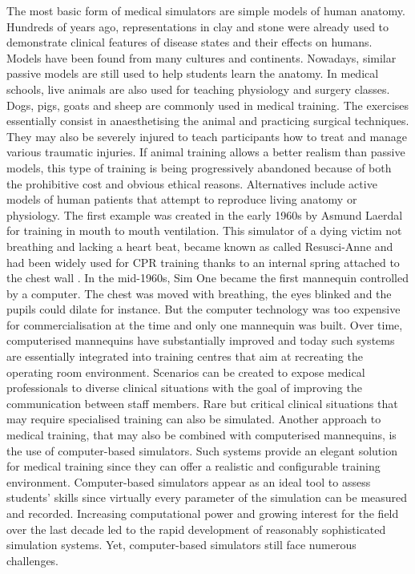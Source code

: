 \bigskip

The most basic form of medical simulators are simple models of human anatomy. Hundreds of years ago, representations in clay and stone were already used to demonstrate clinical features of disease states and their effects on humans. Models have been found from many cultures and continents. Nowadays, similar passive models are still used to help students learn the anatomy. In medical schools, live animals are also used for teaching physiology and surgery classes. Dogs, pigs, goats and sheep are commonly used in medical training. The exercises essentially consist in anaesthetising the animal and practicing surgical techniques. They may also be severely injured to teach participants how to treat and manage various traumatic injuries. If animal training allows a better realism than passive models, this type of training is being progressively abandoned because of both the prohibitive cost and obvious ethical reasons. Alternatives include active models of human patients that attempt to reproduce living anatomy or physiology. The first example was created in the early 1960s by Asmund Laerdal for training in mouth to mouth ventilation. This simulator of a dying victim not breathing and lacking a heart beat, became known as called Resusci-Anne and had been widely used for CPR training thanks to an internal spring attached to the chest wall \citep{Cooper04}. In the mid-1960s, Sim One became the first mannequin controlled by a computer. The chest was moved with breathing, the eyes blinked and the pupils could dilate for instance. But the computer technology was too expensive for commercialisation at the time and only one mannequin was built. Over time, computerised mannequins have substantially improved and today such systems are essentially integrated into training centres that aim at recreating the operating room environment. Scenarios can be created to expose medical professionals to diverse clinical situations with the goal of improving the communication between staff members. Rare but critical clinical situations that may require specialised training can also be simulated. Another approach to medical training, that may also be combined with computerised mannequins, is the use of computer-based simulators. Such systems provide an elegant solution for medical training since they can offer a realistic and configurable training environment. Computer-based simulators appear as an ideal tool to assess students' skills since virtually every parameter of the simulation can be measured and recorded. Increasing computational power and growing interest for the field over the last decade led to the rapid development of reasonably sophisticated simulation systems. Yet, computer-based simulators still face numerous challenges. 


